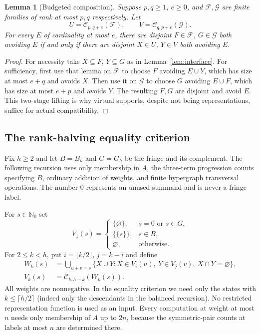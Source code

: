 \documentclass[11pt]{article}
\newtheorem{lemma}[theorem]{Lemma}
\theoremstyle{remark}\newtheorem{remark}[theorem]{Remark}
\newcommand{\N}{\mathbb N_0}
\begin{document}
\begin{lemma}[Budgeted composition]\label{lem:composition}
Suppose $p,q\ge1$, $e\ge0$, and $\mathcal F,\mathcal G$ are finite families of rank at most $p,q$ respectively. Let
\[
 U=\mathcal C_{p,q+e}(\mathcal F),\qquad V=\mathcal C_{q,p+e}(\mathcal G).
\]
For every $E$ of cardinality at most $e$, there are disjoint $F\in\mathcal F$, $G\in\mathcal G$ both avoiding $E$ if and only if there are disjoint $X\in U$, $Y\in V$ both avoiding $E$.
\end{lemma}
\begin{proof}
For necessity take $X\subseteq F$, $Y\subseteq G$ as in Lemma~\ref{lem:interface}. For sufficiency, first use that lemma on $\mathcal F$ to choose $F$ avoiding $E\cup Y$, which has size at most $e+q$ and avoids $X$. Then use it on $\mathcal G$ to choose $G$ avoiding $E\cup F$, which has size at most $e+p$ and avoids $Y$. The resulting $F,G$ are disjoint and avoid $E$. This two-stage lifting is why virtual supports, despite not being representations, suffice for actual compatibility.
\end{proof}

\subsection{The rank-halving equality criterion}
Fix $h\ge2$ and let $B=B_h$ and $G=G_h$ be the fringe and its complement. The following recursion uses only membership in $A$, the three-term progression counts specifying $B$, ordinary addition of weights, and finite hypergraph transversal operations. The number $0$ represents an unused summand and is never a fringe label.

For $s\in\N$ set
\[
 V_1(s)=\begin{cases}
 \{\varnothing\},&s=0\text{ or }s\in G,\\
 \{\{s\}\},&s\in B,\\
 \varnothing,&\text{otherwise}.
 \end{cases}
\]
For $2\le k<h$, put $i=\lfloor k/2\rfloor$, $j=k-i$ and define
\begin{align*}
 W_k(s)&=\bigcup_{u+v=s}\{X\cup Y:X\in V_i(u),\ Y\in V_j(v),\ X\cap Y=\varnothing\},\\
 V_k(s)&=\mathcal C_{k,h-k}(W_k(s)).
\end{align*}
All weights are nonnegative. In the equality criterion we need only the states with $k\le\lceil h/2\rceil$ (indeed only the descendants in the balanced recursion). No restricted representation function is used as an input. Every computation at weight at most $n$ needs only membership of $A$ up to $2n$, because the symmetric-pair counts at labels at most $n$ are determined there.
\end{document}
